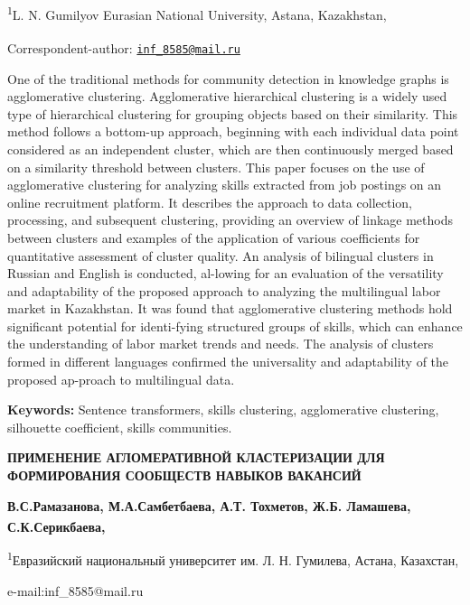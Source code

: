 \textsuperscript{1}L. N. Gumilyov Eurasian National University, Astana,
Kazakhstan,

{\bfseries \textsuperscript{\envelope }}Correspondent-author:
\href{mailto:inf_8585@mail.ru}{\nolinkurl{inf\_8585@mail.ru}}

One of the traditional methods for community detection in knowledge
graphs is agglomerative clustering. Agglomerative hierarchical
clustering is a widely used type of hierarchical clustering for grouping
objects based on their similarity. This method follows a bottom-up
approach, beginning with each individual data point considered as an
independent cluster, which are then continuously merged based on a
similarity threshold between clusters. This paper focuses on the use of
agglomerative clustering for analyzing skills extracted from job
postings on an online recruitment platform. It describes the approach to
data collection, processing, and subsequent clustering, providing an
overview of linkage methods between clusters and examples of the
application of various coefficients for quantitative assessment of
cluster quality. An analysis of bilingual clusters in Russian and
English is conducted, al-lowing for an evaluation of the versatility and
adaptability of the proposed approach to analyzing the multilingual
labor market in Kazakhstan. It was found that agglomerative clustering
methods hold significant potential for identi-fying structured groups of
skills, which can enhance the understanding of labor market trends and
needs. The analysis of clusters formed in different languages confirmed
the universality and adaptability of the proposed ap-proach to
multilingual data.

{\bfseries Keywords:} Sentence transformers, skills clustering,
agglomerative clustering, silhouette coefficient, skills communities.

{\bfseries ПРИМЕНЕНИЕ АГЛОМЕРАТИВНОЙ КЛАСТЕРИЗАЦИИ ДЛЯ ФОРМИРОВАНИЯ
СООБЩЕСТВ НАВЫКОВ ВАКАНСИЙ}

{\bfseries В.С.Рамазанова, М.А.Самбетбаева, А.Т. Тохметов, Ж.Б. Ламашева,
С.К.Серикбаева\textsuperscript{\envelope },}

\textsuperscript{1}Евразийский национальный университет им. Л. Н.
Гумилева, Астана, Казахстан,

e-mail:inf\_8585@mail.ru

